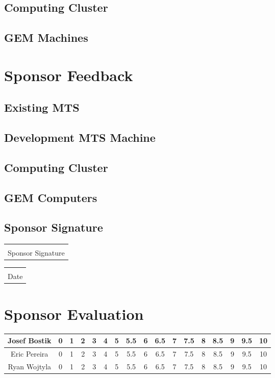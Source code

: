 \documentclass[12pt]{article}
\makeatletter
\newcommand{\titledate}[2][2.5in]{%
	\noindent%
	\begin{tabular}{@{}p{#1}@{}}
		\\ \hline \\[-.75\normalbaselineskip]
		#2
	\end{tabular} \hspace{1in}
	\begin{tabular}{@{}p{#1}@{}}
		\\ \hline \\[-.75\normalbaselineskip]
		Date
	\end{tabular}
}
\makeatother
\begin{document}
\subsection{Computing Cluster}



\subsection{GEM Machines}


\section{Sponsor Feedback}

\subsection{Existing MTS}

\vspace{1in}

\subsection{Development MTS Machine}

\vspace{1in}

\subsection{Computing Cluster}

\vspace{1in}

\subsection{GEM Computers}

\vspace{1in}
\newpage

\subsection{Sponsor Signature}
\vspace{.5in}
 \titledate{Sponsor Signature}
 
\section{Sponsor Evaluation}
\begin{tabular}{|c|c|c|c|c|c|c|c|c|c|c|c|c|c|c|c|c|}
	\hline
	Josef Bostik & 0 & 1 & 2 & 3 & 4 & 5 & 5.5 & 6 & 6.5 & 7 & 7.5 & 8 & 8.5 & 9 & 9.5 & 10\\
	\hline
	Eric Pereira & 0 & 1 & 2 & 3 & 4 & 5 & 5.5 & 6 & 6.5 & 7 & 7.5 & 8 & 8.5 & 9 & 9.5 & 10\\
	\hline
	Ryan Wojtyla & 0 & 1 & 2 & 3 & 4 & 5 & 5.5 & 6 & 6.5 & 7 & 7.5 & 8 & 8.5 & 9 & 9.5 & 10\\
	\hline
\end{tabular}
\end{document}
